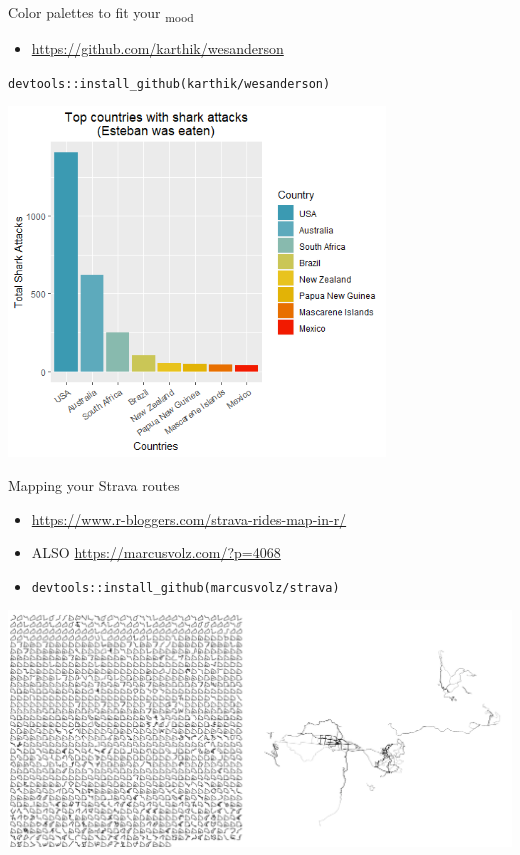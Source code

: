 \documentclass[
  ignorenonframetext,
]{beamer}
\providecommand{\tightlist}{%
  \setlength{\itemsep}{0pt}\setlength{\parskip}{0pt}}
\begin{document}
\begin{frame}[fragile]{Color palettes to fit your \textsubscript{mood}}
\protect\hypertarget{color-palettes-to-fit-your-mood}{}

\begin{itemize}
\tightlist
\item
  \url{https://github.com/karthik/wesanderson}
\end{itemize}

\texttt{devtools::install\_github(karthik/wesanderson)}

\includegraphics[width=0.75\textwidth,height=\textheight]{../external/images/funR_3_wes_anderson.png}

\end{frame}

\begin{frame}[fragile]{Mapping your Strava routes}
\protect\hypertarget{mapping-your-strava-routes}{}

\begin{itemize}
\tightlist
\item
  \url{https://www.r-bloggers.com/strava-rides-map-in-r/}
\item
  ALSO \url{https://marcusvolz.com/?p=4068}
\item
  \texttt{devtools::install\_github(marcusvolz/strava)}
\end{itemize}

\includegraphics{../external/images/funR_4_strava_combo.png}

\end{frame}
\end{document}

